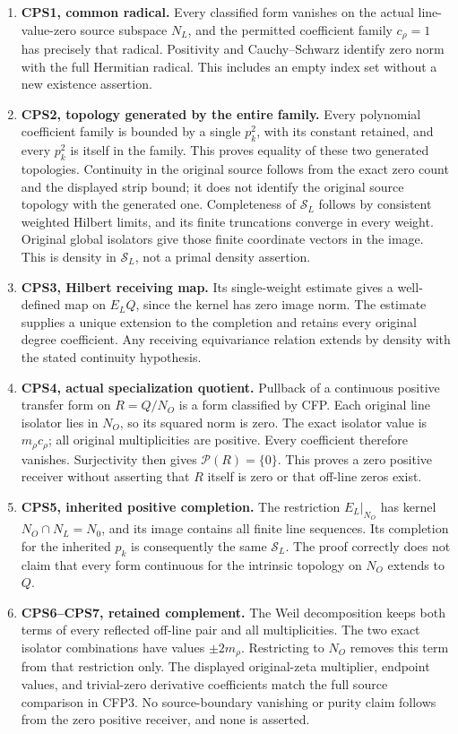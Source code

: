 \begin{enumerate}
\def\labelenumi{\arabic{enumi}.}
\item
  \textbf{CPS1, common radical.} Every classified form vanishes on the
  actual line-value-zero source subspace \(N_L\), and the permitted
  coefficient family \(c_\rho=1\) has precisely that radical. Positivity
  and Cauchy--Schwarz identify zero norm with the full Hermitian
  radical. This includes an empty index set without a new existence
  assertion.
\item
  \textbf{CPS2, topology generated by the entire family.} Every
  polynomial coefficient family is bounded by a single \(p_k^2\), with
  its constant retained, and every \(p_k^2\) is itself in the family.
  This proves equality of these two generated topologies. Continuity in
  the original source follows from the exact zero count and the
  displayed strip bound; it does not identify the original source
  topology with the generated one. Completeness of \(\mathcal S_L\)
  follows by consistent weighted Hilbert limits, and its finite
  truncations converge in every weight. Original global isolators give
  those finite coordinate vectors in the image. This is density in
  \(\mathcal S_L\), not a primal density assertion.
\item
  \textbf{CPS3, Hilbert receiving map.} Its single-weight estimate gives
  a well-defined map on \(E_LQ\), since the kernel has zero image norm.
  The estimate supplies a unique extension to the completion and retains
  every original degree coefficient. Any receiving equivariance relation
  extends by density with the stated continuity hypothesis.
\item
  \textbf{CPS4, actual specialization quotient.} Pullback of a
  continuous positive transfer form on \(R=Q/N_O\) is a form classified
  by CFP. Each original line isolator lies in \(N_O\), so its squared
  norm is zero. The exact isolator value is \(m_\rho c_\rho\); all
  original multiplicities are positive. Every coefficient therefore
  vanishes. Surjectivity then gives \(\mathscr P(R)=\{0\}\). This proves
  a zero positive receiver without asserting that \(R\) itself is zero
  or that off-line zeros exist.
\item
  \textbf{CPS5, inherited positive completion.} The restriction
  \(E_L|_{N_O}\) has kernel \(N_O\cap N_L=N_0\), and its image contains
  all finite line sequences. Its completion for the inherited \(p_k\) is
  consequently the same \(\mathcal S_L\). The proof correctly does not
  claim that every form continuous for the intrinsic topology on \(N_O\)
  extends to \(Q\).
\item
  \textbf{CPS6--CPS7, retained complement.} The Weil decomposition keeps
  both terms of every reflected off-line pair and all multiplicities.
  The two exact isolator combinations have values \(\pm2m_\rho\).
  Restricting to \(N_O\) removes this term from that restriction only.
  The displayed original-zeta multiplier, endpoint values, and
  trivial-zero derivative coefficients match the full source comparison
  in CFP3. No source-boundary vanishing or purity claim follows from the
  zero positive receiver, and none is asserted.
\end{enumerate}

